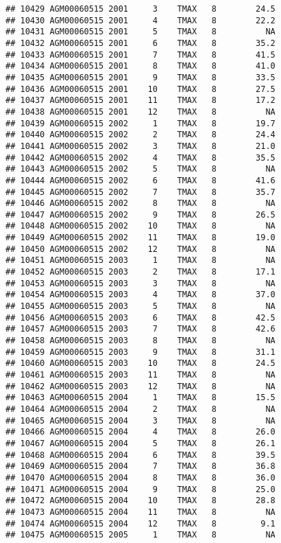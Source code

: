 \documentclass{article}\usepackage[]{graphicx}\usepackage[]{color}
\makeatletter
\newenvironment{kframe}{%
 \def\at@end@of@kframe{}%
 \ifinner\ifhmode%
  \def\at@end@of@kframe{\end{minipage}}%
  \begin{minipage}{\columnwidth}%
 \fi\fi%
 \def\FrameCommand##1{\hskip\@totalleftmargin \hskip-\fboxsep
 \colorbox{shadecolor}{##1}\hskip-\fboxsep
     \hskip-\linewidth \hskip-\@totalleftmargin \hskip\columnwidth}%
 \MakeFramed {\advance\hsize-\width
   \@totalleftmargin\z@ \linewidth\hsize
   \@setminipage}}%
 {\par\unskip\endMakeFramed%
 \at@end@of@kframe}
\newenvironment{knitrout}{}{} %
\makeatother
\begin{document}
\begin{knitrout}
\begin{kframe}
\begin{verbatim}
## 10429 AGM00060515 2001     3    TMAX   8        24.5
## 10430 AGM00060515 2001     4    TMAX   8        22.2
## 10431 AGM00060515 2001     5    TMAX   8          NA
## 10432 AGM00060515 2001     6    TMAX   8        35.2
## 10433 AGM00060515 2001     7    TMAX   8        41.5
## 10434 AGM00060515 2001     8    TMAX   8        41.0
## 10435 AGM00060515 2001     9    TMAX   8        33.5
## 10436 AGM00060515 2001    10    TMAX   8        27.5
## 10437 AGM00060515 2001    11    TMAX   8        17.2
## 10438 AGM00060515 2001    12    TMAX   8          NA
## 10439 AGM00060515 2002     1    TMAX   8        19.7
## 10440 AGM00060515 2002     2    TMAX   8        24.4
## 10441 AGM00060515 2002     3    TMAX   8        21.0
## 10442 AGM00060515 2002     4    TMAX   8        35.5
## 10443 AGM00060515 2002     5    TMAX   8          NA
## 10444 AGM00060515 2002     6    TMAX   8        41.6
## 10445 AGM00060515 2002     7    TMAX   8        35.7
## 10446 AGM00060515 2002     8    TMAX   8          NA
## 10447 AGM00060515 2002     9    TMAX   8        26.5
## 10448 AGM00060515 2002    10    TMAX   8          NA
## 10449 AGM00060515 2002    11    TMAX   8        19.0
## 10450 AGM00060515 2002    12    TMAX   8          NA
## 10451 AGM00060515 2003     1    TMAX   8          NA
## 10452 AGM00060515 2003     2    TMAX   8        17.1
## 10453 AGM00060515 2003     3    TMAX   8          NA
## 10454 AGM00060515 2003     4    TMAX   8        37.0
## 10455 AGM00060515 2003     5    TMAX   8          NA
## 10456 AGM00060515 2003     6    TMAX   8        42.5
## 10457 AGM00060515 2003     7    TMAX   8        42.6
## 10458 AGM00060515 2003     8    TMAX   8          NA
## 10459 AGM00060515 2003     9    TMAX   8        31.1
## 10460 AGM00060515 2003    10    TMAX   8        24.5
## 10461 AGM00060515 2003    11    TMAX   8          NA
## 10462 AGM00060515 2003    12    TMAX   8          NA
## 10463 AGM00060515 2004     1    TMAX   8        15.5
## 10464 AGM00060515 2004     2    TMAX   8          NA
## 10465 AGM00060515 2004     3    TMAX   8          NA
## 10466 AGM00060515 2004     4    TMAX   8        26.0
## 10467 AGM00060515 2004     5    TMAX   8        26.1
## 10468 AGM00060515 2004     6    TMAX   8        39.5
## 10469 AGM00060515 2004     7    TMAX   8        36.8
## 10470 AGM00060515 2004     8    TMAX   8        36.0
## 10471 AGM00060515 2004     9    TMAX   8        25.0
## 10472 AGM00060515 2004    10    TMAX   8        28.8
## 10473 AGM00060515 2004    11    TMAX   8          NA
## 10474 AGM00060515 2004    12    TMAX   8         9.1
## 10475 AGM00060515 2005     1    TMAX   8          NA

\end{verbatim}
\end{kframe}
\end{knitrout}
\end{document}
